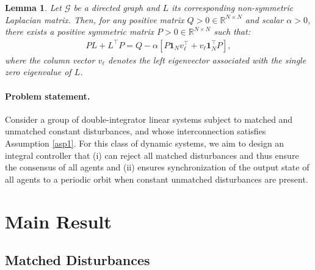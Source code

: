 \documentclass[journal,twoside]{IEEEtran}
\newtheorem{lemma}{Lemma}
\newtheorem{assumption}{Assumption}
\def\rea{\mathbb{R}}
\def\lab{\label}
\def\rea{\mathbb{R}}
\begin{document}
\begin{lemma} \em
\label{lem2}
\cite{PANLORSUK} Let ${\mathcal G}$ be a directed graph and $L$ its corresponding non-symmetric Laplacian matrix. 
Then, for any positive matrix $Q>0 \in \rea^{N \times N}$ and scalar $\alpha>0$, there exists a positive symmetric matrix $P>0 \in \rea^{N \times N}$ such that:
\begin{align}
PL+L^\top P= Q-\alpha [P {\boldsymbol 1}_N  v_\ell^\top +v_\ell  {\boldsymbol 1}_N^\top P],
\end{align}
  where the column vector $v_\ell$ denotes the left eigenvector associated with the single zero eigenvalue of $L$.
\end{lemma}



 

\paragraph{Problem statement.} Consider a group of double-integrator linear systems subject to matched and unmatched constant disturbances, and whose interconnection satisfies Assumption \ref{asp1}.
For this class of dynamic systems, we aim to design an integral controller that  (i) can reject all matched disturbances and thus ensure the consensus of all agents and (ii) ensures synchronization of the output state of all agents to a periodic orbit when constant unmatched disturbances are present.



\section{Main Result}
\lab{sec2}

\subsection*{Matched Disturbances}
  
\end{document}

